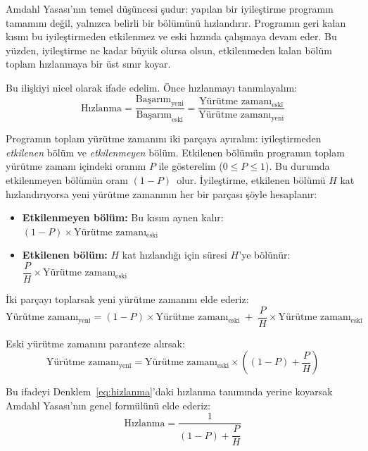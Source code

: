 Amdahl Yasası'nın temel düşüncesi şudur: yapılan bir iyileştirme programın tamamını değil, yalnızca belirli bir bölümünü hızlandırır. Programın geri kalan kısmı bu iyileştirmeden etkilenmez ve eski hızında çalışmaya devam eder. Bu yüzden, iyileştirme ne kadar büyük olursa olsun, etkilenmeden kalan bölüm toplam hızlanmaya bir üst sınır koyar.

Bu ilişkiyi nicel olarak ifade edelim. Önce hızlanmayı tanımlayalım:
\begin{equation}
\text{Hızlanma} = \frac{\text{Başarım}_{\text{yeni}}}{\text{Başarım}_{\text{eski}}} = \frac{\text{Yürütme zamanı}_{\text{eski}}}{\text{Yürütme zamanı}_{\text{yeni}}}
\label{eq:hizlanma}
\end{equation}

Programın toplam yürütme zamanını iki parçaya ayıralım: iyileştirmeden \emph{etkilenen} bölüm ve \emph{etkilenmeyen} bölüm. Etkilenen bölümün programın toplam yürütme zamanı içindeki oranını $P$ ile gösterelim ($0 \le P \le 1$). Bu durumda etkilenmeyen bölümün oranı $(1-P)$~olur. İyileştirme, etkilenen bölümü $H$ kat hızlandırıyorsa yeni yürütme zamanının her bir parçası şöyle hesaplanır:
\begin{itemize}
    \item \textbf{Etkilenmeyen bölüm:} Bu kısım aynen kalır: \quad $(1-P) \times \text{Yürütme zamanı}_{\text{eski}}$
    \item \textbf{Etkilenen bölüm:} $H$ kat hızlandığı için süresi $H$'ye bölünür: \quad $\dfrac{P}{H} \times \text{Yürütme zamanı}_{\text{eski}}$
\end{itemize}

İki parçayı toplarsak yeni yürütme zamanını elde ederiz:
\begin{equation}
\text{Yürütme zamanı}_{\text{yeni}} = (1 - P) \times \text{Yürütme zamanı}_{\text{eski}} \;+\; \frac{P}{H} \times \text{Yürütme zamanı}_{\text{eski}}
\end{equation}

Eski yürütme zamanını paranteze alırsak:
\begin{equation}
\text{Yürütme zamanı}_{\text{yeni}} = \text{Yürütme zamanı}_{\text{eski}} \times \left( (1 - P) + \frac{P}{H} \right)
\label{eq:amdahl-zaman}
\end{equation}

Bu ifadeyi Denklem~\ref{eq:hizlanma}'daki hızlanma tanımında yerine koyarsak Amdahl Yasası'nın genel formülünü elde ederiz:
\begin{equation}
\text{Hızlanma} = \frac{1}{(1-P) + \dfrac{P}{H}}
\label{eq:amdahl}
\end{equation}

